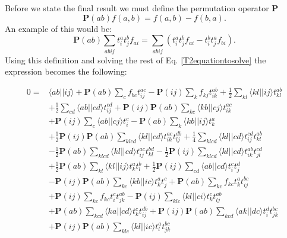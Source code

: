 \documentclass[a4paper,norsk,11pt,twoside]{report}
\begin{document}
Before we state the final result we must define the permutation operator $\textbf{P}$
\begin{equation}
\textbf{P}(ab) f(a,b) = f(a,b) - f(b,a) .
\end{equation}
An example of this would be:
\begin{equation}
\textbf{P}(ab) \sum_{abij} t_i^a t_j^b f_{ai} = \sum_{abij} \left( t_i^a t_j^b f_{ai} - t_i^b t_j^a f_{bi} \right) .
\end{equation} 
Using this definition and solving the rest of Eq. \eqref{T2equationtosolve} the expression becomes the following:

\begin{align}
0 = & \langle ab || ij \rangle
+ \textbf{P}(ab) \sum_c f_{bc} t_{ij}^{ac}
- \textbf{P}(ij) \sum_k f_{kj} t_{ik}^{ab}
+ \frac{1}{2} \sum_{kl} \langle kl||ij \rangle t_{kl}^{ab} \label{T2equation} \\ &
+ \frac{1}{2} \sum_{cd} \langle ab || cd \rangle t_{ij}^{cd}
+ \textbf{P}(ij) \textbf{P}(ab) \sum_{kc}
\langle kb||cj \rangle t_{ik}^{ac} \nonumber \\ &
+ \textbf{P}(ij) \sum_c \langle ab || cj \rangle t_i^c
- \textbf{P}(ab) \sum_k \langle kb || ij \rangle t_k^a
\nonumber \\ &
+ \frac{1}{2} \textbf{P}(ij) \textbf{P}(ab) \sum_{klcd}
\langle kl || cd \rangle t_{ik}^{ac} t_{lj}^{db} 
+ \frac{1}{4} \sum_{klcd} \langle kl || cd \rangle
t_{ij}^{cd} t_{kl}^{ab} \nonumber \\ &
-  \frac{1}{2} \textbf{P}(ab)\sum_{klcd} \langle kl || cd \rangle t_{ij}^{ac} t_{kl}^{bd}
- \frac{1}{2} \textbf{P}(ij) \sum_{klcd} \langle kl || cd \rangle t_{ik}^{ab} t_{jl}^{cd} \nonumber \\ &
+ \frac{1}{2} \textbf{P}(ab) \sum_{kl}
\langle kl || ij \rangle t_k^a t_l^b 
+ \frac{1}{2} \textbf{P}(ij) \sum_{cd} \langle ab || cd \rangle t_i^c t_j^d \nonumber \\ &
- \textbf{P}(ij) \textbf{P}(ab) \sum_{kc} \langle kb || ic \rangle t_k^a t_j^c
+  \textbf{P}(ab) \sum_{kc} f_{kc} t_k^a t_{ij}^{bc} 
\nonumber \\ &
+ \textbf{P}(ij) \sum_{kc} f_{kc} t_i^c t_{jk}^{ab}
- \textbf{P}(ij) \sum_{klc} \langle kl || ci \rangle t_k^c t_{lj}^{ab}  \nonumber \\ &
+ \textbf{P} (ab) \sum_{kcd} \langle ka || cd \rangle t_k^c t_{ij}^{db} 
+ \textbf{P}(ij) \textbf{P}(ab) \sum_{kcd} \langle ak || dc \rangle t_i^d t_{jk}^{bc} \nonumber \\ &
+ \textbf{P} (ij) \textbf{P}(ab) \sum_{klc} \langle kl || ic \rangle t_l^a t_{jk}^{bc} 

\end{align}
\end{document}
